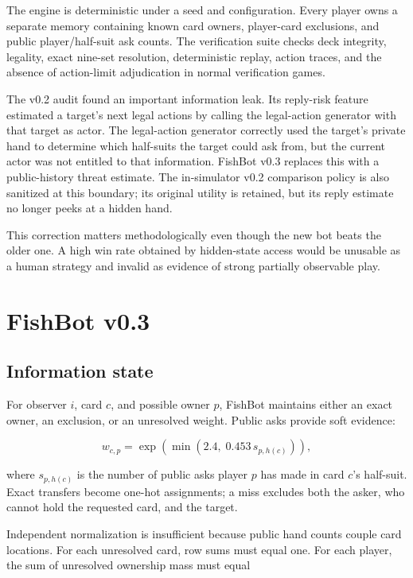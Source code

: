\documentclass[11pt]{article}
\begin{document}
The engine is deterministic under a seed and configuration. Every player owns a separate memory containing known card owners, player-card exclusions, and public player/half-suit ask counts. The verification suite checks deck integrity, legality, exact nine-set resolution, deterministic replay, action traces, and the absence of action-limit adjudication in normal verification games.

The v0.2 audit found an important information leak. Its reply-risk feature estimated a target's next legal actions by calling the legal-action generator with that target as actor. The legal-action generator correctly used the target's private hand to determine which half-suits the target could ask from, but the current actor was not entitled to that information. FishBot v0.3 replaces this with a public-history threat estimate. The in-simulator v0.2 comparison policy is also sanitized at this boundary; its original utility is retained, but its reply estimate no longer peeks at a hidden hand.

This correction matters methodologically even though the new bot beats the older one. A high win rate obtained by hidden-state access would be unusable as a human strategy and invalid as evidence of strong partially observable play.

\section{FishBot v0.3}

\subsection{Information state}

For observer $i$, card $c$, and possible owner $p$, FishBot maintains either an exact owner, an exclusion, or an unresolved weight. Public asks provide soft evidence:

\begin{equation}
w_{c,p} = \exp\left(\min\left(2.4,\;0.453\,s_{p,h(c)}\right)\right),
\end{equation}

where $s_{p,h(c)}$ is the number of public asks player $p$ has made in card $c$'s half-suit. Exact transfers become one-hot assignments; a miss excludes both the asker, who cannot hold the requested card, and the target.

Independent normalization is insufficient because public hand counts couple card locations. For each unresolved card, row sums must equal one. For each player, the sum of unresolved ownership mass must equal
\end{document}
